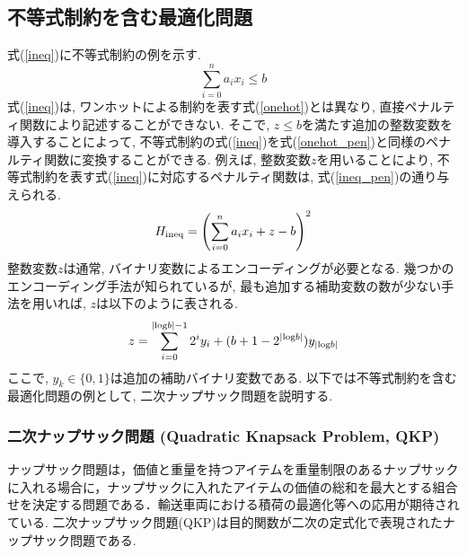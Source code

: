 \documentclass[submit,techrep,noauthor]{ipsj}
\begin{document}
\subsection{不等式制約を含む最適化問題}
式(\ref{ineq})に不等式制約の例を示す.
\begin{equation}
\sum_{i=0}^{n}a_{i}x_{i}\le b \label{ineq}
\end{equation}
式(\ref{ineq})は, ワンホットによる制約を表す式(\ref{onehot})とは異なり, 直接ペナルティ関数により記述することができない. そこで, $z\le b$を満たす追加の整数変数を導入することによって, 不等式制約の式(\ref{ineq})を式(\ref{onehot_pen})と同様のペナルティ関数に変換することができる. 例えば, 整数変数$z$を用いることにより, 不等式制約を表す式(\ref{ineq})に対応するペナルティ関数は, 式(\ref{ineq_pen})の通り与えられる.
\begin{equation}
H_{\rm{ineq}} = \left(\sum_{i=0}^{n}a_{i}x_{i}+z-b\right)^{2} \label{ineq_pen}
\end{equation}
整数変数$z$は通常, バイナリ変数によるエンコーディングが必要となる. 幾つかのエンコーディング手法が知られているが, 最も追加する補助変数の数が少ない手法を用いれば, $z$は以下のように表される.
\begin{equation}
z = \sum_{i=0}^{|{\rm{log}}b|-1}2^{i}y_{i}+(b+1-2^{|{\rm{log}}b|})y_{|{\rm{log}}b|}
\end{equation}
ここで, $y_{k}\in \{0, 1\}$は追加の補助バイナリ変数である. 以下では不等式制約を含む最適化問題の例として, 二次ナップサック問題を説明する.

\subsubsection{二次ナップサック問題 (Quadratic Knapsack Problem, QKP)}
ナップサック問題は，価値と重量を持つアイテムを重量制限のあるナップサックに入れる場合に，ナップサックに入れたアイテムの価値の総和を最大とする組合せを決定する問題である．輸送車両における積荷の最適化等への応用が期待されている. 二次ナップサック問題(QKP)は目的関数が二次の定式化で表現されたナップサック問題である. 

\end{document}
